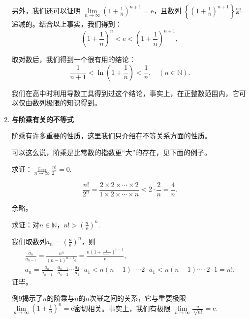 \begin{enumerate}
          另外，我们还可以证明 $\lim\limits_{n \to \infty}\left (1+\frac{1}{n}\right )^{n+1}=\mathrm e$，且数列
          $\left\{  \left (1+\frac{1}{n}\right )^{n+1} \right\}  $是递减的。结合以上事实，我们得到：
          \[
              \left (1+\frac{1}{n}\right )^n<\mathrm e<\left (1+\frac{1}{n}\right )^{n+1\!\!\!\!\!\!\!\!\!\!\!\!}
              ,\]


          取对数后，我们得到一个很有用的结论：
          \[
              \frac{1}{n+1}<\ln \left( 1+\frac{1}{n} \right) <\frac{1}{n}, \quad (n\in \mathbb{N} ).
          \]


          我们在高中时利用导数工具得到过这个结论，事实上，在正整数范围内，它可以仅由数列极限的知识得到。

    \item \textbf{与阶乘有关的不等式}

          阶乘有许多重要的性质，这里我们只介绍在不等关系方面的性质。

          可以这么说，阶乘是比常数的指数更“大”的存在，见下面的例子。
          \begin{example}
              求证：$\lim\limits_{n \to \infty} \frac{n!}{2^n} =0$.
          \end{example}
          \begin{prove}
              \[
                  \frac{n!}{2^n}=\frac{2\times 2\times \cdots\times 2}{1\times 2\times \cdots\times n}
                  <2\cdot \frac{2}{n}=\frac{4}{n}
                  .\]

              余略。
          \end{prove}


          \begin{example}
              求证：对$n\in \mathbb{N}$，$n!>\left (\frac{n}{\mathrm e} \right )^n$.
          \end{example}
          \begin{prove}
              我们取数列$a_n=\left (\frac{n}{\mathrm e} \right )^n$，则
              \begin{gather}
                  \frac{a_n}{a_{n-1}}=\frac{n^n}{(n-1)^{n-1}\mathrm e}=\frac{n\left (1+\frac{1}{n-1}\right )^{n-1}}{\mathrm e},\\
                  a_n=\frac{a_n}{a_{n-1}} \cdot \frac{a_{n-1}}{a_{n-2}}\cdots \frac{a_2}{a_1} \cdot a_1< n(n-1)\cdot \cdots 2\cdot a_1<n(n-1)\cdots \cdot 2\cdot 1=n!.
              \end{gather}
              证毕。
          \end{prove}

          例9揭示了$n$的阶乘与$n$的$n$次幂之间的关系，它与重要极限$\lim\limits_{n \to \infty}\left (1
              +\frac{1}{n}\right )^n=\mathrm e$密切相关。事实上，我们有极限
          $\lim\limits_{n \to \infty}\frac{n}{\sqrt[n]{n!}}=\mathrm e$.
\end{enumerate}

